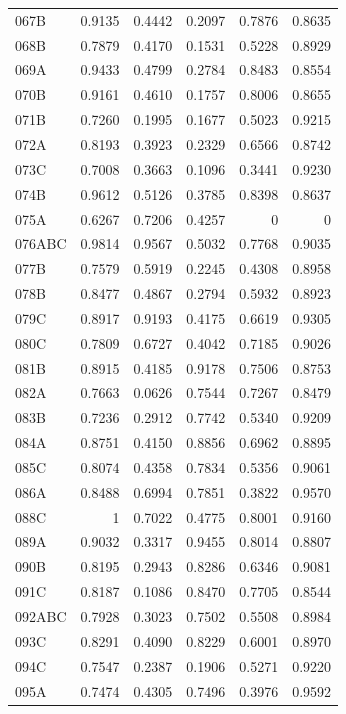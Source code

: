 \begin{longtable}{lrrrrr}
  067B & 0.9135 & 0.4442 & 0.2097 & 0.7876 & 0.8635 \\
  068B & 0.7879 & 0.4170 & 0.1531 & 0.5228 & 0.8929 \\
  069A & 0.9433 & 0.4799 & 0.2784 & 0.8483 & 0.8554 \\
  070B & 0.9161 & 0.4610 & 0.1757 & 0.8006 & 0.8655 \\
  071B & 0.7260 & 0.1995 & 0.1677 & 0.5023 & 0.9215 \\
  072A & 0.8193 & 0.3923 & 0.2329 & 0.6566 & 0.8742 \\
  073C & 0.7008 & 0.3663 & 0.1096 & 0.3441 & 0.9230 \\
  074B & 0.9612 & 0.5126 & 0.3785 & 0.8398 & 0.8637 \\
  075A & 0.6267 & 0.7206 & 0.4257 & 0 & 0 \\
  076ABC & 0.9814 & 0.9567 & 0.5032 & 0.7768 & 0.9035 \\
  077B & 0.7579 & 0.5919 & 0.2245 & 0.4308 & 0.8958 \\
  078B & 0.8477 & 0.4867 & 0.2794 & 0.5932 & 0.8923 \\
  079C & 0.8917 & 0.9193 & 0.4175 & 0.6619 & 0.9305 \\
  080C & 0.7809 & 0.6727 & 0.4042 & 0.7185 & 0.9026 \\
  081B & 0.8915 & 0.4185 & 0.9178 & 0.7506 & 0.8753 \\
  082A & 0.7663 & 0.0626 & 0.7544 & 0.7267 & 0.8479 \\
  083B & 0.7236 & 0.2912 & 0.7742 & 0.5340 & 0.9209 \\
  084A & 0.8751 & 0.4150 & 0.8856 & 0.6962 & 0.8895 \\
  085C & 0.8074 & 0.4358 & 0.7834 & 0.5356 & 0.9061 \\
  086A & 0.8488 & 0.6994 & 0.7851 & 0.3822 & 0.9570 \\
  088C & 1 & 0.7022 & 0.4775 & 0.8001 & 0.9160 \\
  089A & 0.9032 & 0.3317 & 0.9455 & 0.8014 & 0.8807 \\
  090B & 0.8195 & 0.2943 & 0.8286 & 0.6346 & 0.9081 \\
  091C & 0.8187 & 0.1086 & 0.8470 & 0.7705 & 0.8544 \\
  092ABC & 0.7928 & 0.3023 & 0.7502 & 0.5508 & 0.8984 \\
  093C & 0.8291 & 0.4090 & 0.8229 & 0.6001 & 0.8970 \\
  094C & 0.7547 & 0.2387 & 0.1906 & 0.5271 & 0.9220 \\
  095A & 0.7474 & 0.4305 & 0.7496 & 0.3976 & 0.9592 \\

\end{longtable}
